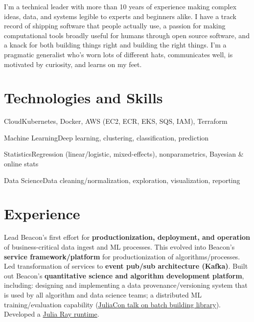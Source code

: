 \documentclass[10pt,colorlinks,urlcolor=gray]{moderncv}
\begin{document}
\makecvtitle

I'm a technical leader with more than 10 years of experience making complex ideas, data, and
systems legible to experts and beginners alike.  I have a track record of shipping software
that people actually use, a passion for making computational tools broadly useful for humans
through open source software, and a knack for both building things right and building the
right things.  I'm a pragmatic generalist who's worn lots of different hats, communicates
well, is motivated by curiosity, and learns on my feet.

\section{Technologies and Skills}

%
           {Cloud}{Kubernetes, Docker, AWS (EC2, ECR, EKS, SQS, IAM), Terraform}

%
           {Machine Learning}{Deep learning, clustering, classification, prediction}

%
           {Statistics}{Regression (linear/logistic, mixed-effects), nonparametrics,
                        Bayesian \& online stats}

%
           {Data Science}{Data cleaning/normalization, exploration, visualization, reporting}

\section{Experience}

 {Lead Beacon's first effort for \textbf{productionization,
    deployment, and operation} of business-critical data ingest and ML processes.  This
  evolved into Beacon's \textbf{service framework/platform} for productionization of
  algorithms/processes.  Led transformation of services to \textbf{event pub/sub
    architecture (Kafka)}.  Built out Beacon's \textbf{quantitative science and algorithm
    development platform}, including: designing and implementing a data
  provenance/versioning system that is used by all algorithm and data science teams; a
  distributed ML training/evaluation capability
  (\href{https://www.youtube.com/watch?v=szjMOSuUYU4}{JuliaCon talk on batch building
    library}).  Developed a \href{https://github.com/beacon-biosignals/Ray.jl}{Julia Ray
    runtime}.}
\end{document}
